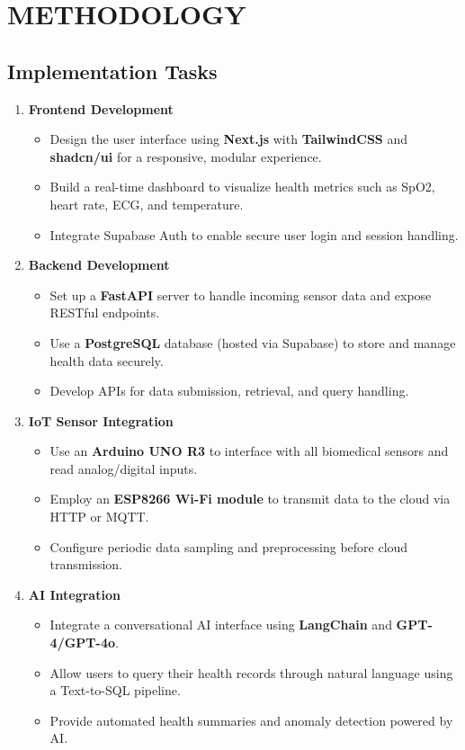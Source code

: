 \section{METHODOLOGY}

\subsection{Implementation Tasks}

\begin{enumerate}

\item \textbf{Frontend Development}
\begin{itemize}
    \item Design the user interface using \textbf{Next.js} with \textbf{TailwindCSS} and \textbf{shadcn/ui} for a responsive, modular experience.
    \item Build a real-time dashboard to visualize health metrics such as SpO2, heart rate, ECG, and temperature.
    \item Integrate Supabase Auth to enable secure user login and session handling.
\end{itemize}

\item \textbf{Backend Development}
\begin{itemize}
    \item Set up a \textbf{FastAPI} server to handle incoming sensor data and expose RESTful endpoints.
    \item Use a \textbf{PostgreSQL} database (hosted via Supabase) to store and manage health data securely.
    \item Develop APIs for data submission, retrieval, and query handling.
\end{itemize}

\item \textbf{IoT Sensor Integration}
\begin{itemize}
    \item Use an \textbf{Arduino UNO R3} to interface with all biomedical sensors and read analog/digital inputs.
    \item Employ an \textbf{ESP8266 Wi-Fi module} to transmit data to the cloud via HTTP or MQTT.
    \item Configure periodic data sampling and preprocessing before cloud transmission.
\end{itemize}

\item \textbf{AI Integration}
\begin{itemize}
    \item Integrate a conversational AI interface using \textbf{LangChain} and \textbf{GPT-4/GPT-4o}.
    \item Allow users to query their health records through natural language using a Text-to-SQL pipeline.
    \item Provide automated health summaries and anomaly detection powered by AI.
\end{itemize}

\end{enumerate}
